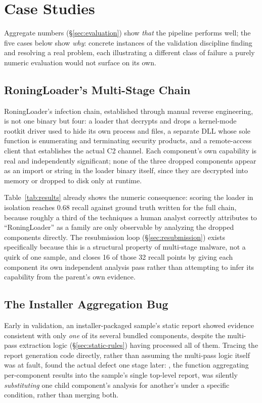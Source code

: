 \section{Case Studies}
\label{sec:case-studies}

Aggregate numbers (\S\ref{sec:evaluation}) show \emph{that} the
pipeline performs well; the five cases below show \emph{why}: concrete
instances of the validation discipline finding and resolving a real
problem, each illustrating a different class of failure a purely
numeric evaluation would not surface on its own.

\subsection{RoningLoader's Multi-Stage Chain}
\label{sec:case-roning}

RoningLoader's infection chain, established through manual reverse
engineering, is not one binary but four: a loader that decrypts and
drops a kernel-mode rootkit driver used to hide its own process and
files, a separate DLL whose sole function is enumerating and
terminating security products, and a remote-access client that
establishes the actual C2 channel. Each component's own capability is
real and independently significant; none of the three dropped
components appear as an import or string in the loader binary itself,
since they are decrypted into memory or dropped to disk only at
runtime.

Table~\ref{tab:results} already shows the numeric consequence:
scoring the loader in isolation reaches 0.68 recall against ground
truth written for the full chain, because roughly a third of the
techniques a human analyst correctly attributes to ``RoningLoader'' as
a family are only observable by analyzing the dropped components
directly. The resubmission loop (\S\ref{sec:resubmission}) exists
specifically because this is a structural property of multi-stage
malware, not a quirk of one sample, and closes 16 of those 32 recall
points by giving each component its own independent analysis pass
rather than attempting to infer its capability from the parent's own
evidence.

\subsection{The Installer Aggregation Bug}
\label{sec:case-installer}

Early in validation, an installer-packaged sample's static report
showed evidence consistent with only \emph{one} of its several bundled
components, despite the multi-pass extraction logic
(\S\ref{sec:static-rules}) having processed all of them. Tracing the
report generation code directly, rather than assuming the multi-pass
logic itself was at fault, found the actual defect one stage later:
, the function aggregating per-component
results into the sample's single top-level report, was silently
\emph{substituting} one child component's analysis for another's under
a specific condition, rather than merging both.

